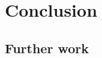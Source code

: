 \documentclass[dissertation.tex]{subfiles}
\begin{document}
\chapter{Conclusion}


\section{Further work}
\end{document}
